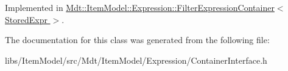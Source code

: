 Implemented in \hyperlink{class_mdt_1_1_item_model_1_1_expression_1_1_filter_expression_container_a918fdd7c8ae52da3e2bf78bde697d1d9}{Mdt\+::\+Item\+Model\+::\+Expression\+::\+Filter\+Expression\+Container$<$ Stored\+Expr $>$}.



The documentation for this class was generated from the following file\+:\begin{DoxyCompactItemize}
\item 
libs/\+Item\+Model/src/\+Mdt/\+Item\+Model/\+Expression/Container\+Interface.\+h\end{DoxyCompactItemize}
